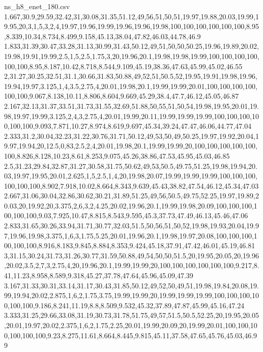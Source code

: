 \begin{filecontents*}[overwrite]{ns_h8_enet_180.csv}
1.667,30.9,29.59,32.42,31,30.08,31.35,51.12,49,56,51,50,51,19.97,19.88,20.03,19.99,19.95,20,3,1,5,3,2,4,19.97,19.96,19.99,19.96,19.96,19.98,100,100,100,100,100,100,8.95,8.339,10.34,8.734,8.499,9.158,45.13,38.04,47.82,46.03,44.78,46.9
1.833,31.39,30.47,33.28,31.13,30.99,31.43,50.12,49,51,50,50,50.25,19.96,19.89,20.02,19.98,19.91,19.99,2.5,1,5,2.5,1.75,3,20,19.96,20.1,19.98,19.98,19.99,100,100,100,100,100,100,8.95,8.187,10.42,8.718,8.544,9.109,45.19,38.36,47.63,45.99,45.02,46.55
2,31.27,30.25,32.51,31.1,30.66,31.83,50.88,49,52,51,50.5,52,19.95,19.91,19.98,19.96,19.94,19.97,3.125,1,4,3.5,2.75,4,20.01,19.98,20.1,19.99,19.99,20.01,100,100,100,100,100,100,9.067,8.138,10.11,8.806,8.604,9.669,45.29,38.4,47.7,46.12,45.05,46.87
2.167,32.13,31.37,33.51,31.73,31.55,32.69,51.88,50,55,51,50,54,19.98,19.95,20.01,19.98,19.97,19.99,3.125,2,4,3,2.75,4,20.01,19.99,20.11,19.99,19.99,19.99,100,100,100,100,100,100,9.093,7.871,10.27,8.974,8.619,9.697,45.34,39.24,47.47,46.06,44.77,47.04
2.333,31.2,30.04,32.23,31.22,30.76,31.71,50.12,49,53,50,49,50.25,19.97,19.92,20.04,19.97,19.94,20,12.5,0,83,2.5,2,4,20.01,19.98,20.1,19.99,19.99,20,100,100,100,100,100,100,8.826,8.128,10.23,8.61,8.253,9.075,45.26,38.86,47.53,45.95,45.03,46.85
2.5,31.23,29.84,32.87,31.27,30.58,31.75,50.62,49,53,50.5,49.75,51.25,19.98,19.94,20.03,19.97,19.95,20.01,2.625,1,5,2.5,1,4,20,19.98,20.07,19.99,19.99,19.99,100,100,100,100,100,100,8.902,7.918,10.02,8.664,8.343,9.639,45.43,38.82,47.54,46.12,45.34,47.03
2.667,31.06,30.04,32.86,30.62,30.21,31.89,51.25,49,56,50.5,49.75,52.25,19.97,19.89,20.03,20,19.92,20,3.375,2,6,3,2,4.25,20.02,19.96,20.1,19.99,19.98,20.09,100,100,100,100,100,100,9.03,7.925,10.47,8.815,8.543,9.595,45.3,37.73,47.49,46.13,45.46,47.06
2.833,31.65,30.26,33.94,31.71,30.77,32.03,51.5,50,56,51,50,52,19.98,19.93,20.04,19.97,19.96,19.98,3.375,1,6,3,1.75,5.25,20.01,19.96,20.1,19.98,19.97,20.08,100,100,100,100,100,100,8.916,8.183,9.845,8.884,8.353,9.424,45.18,37.91,47.42,46.01,45.19,46.81
3,31.15,30.24,31.73,31.26,30.77,31.59,50.88,49,54,50,50,51.5,20,19.95,20.05,20,19.96,20.02,3.5,2,7,3,2.75,4,20,19.96,20.1,19.99,19.99,20,100,100,100,100,100,100,9.217,8.41,11.23,8.958,8.589,9.318,45.27,37.78,47.64,45.96,45.09,47.39
3.167,31.33,30.31,33.14,31.17,30.43,31.85,50.12,49,52,50,49,51,19.98,19.84,20.08,19.99,19.94,20.02,2.875,1,6,2,1.75,3.75,19.99,19.99,20,19.99,19.99,19.99,100,100,100,100,100,100,9.186,8.241,11.19,8.8,8.509,9.532,45.32,37.89,47.87,45.99,45.16,47.24
3.333,31.25,29.66,33.08,31.19,30.73,31.78,51.75,49,57,51.5,50.5,52.25,20,19.95,20.05,20.01,19.97,20.02,2.375,1,6,2,1.75,2.25,20.01,19.99,20.09,20,19.99,20.01,100,100,100,100,100,100,9.23,8.275,11.61,8.664,8.445,9.815,45.11,37.58,47.65,45.76,45.03,46.99

\end{filecontents*}
